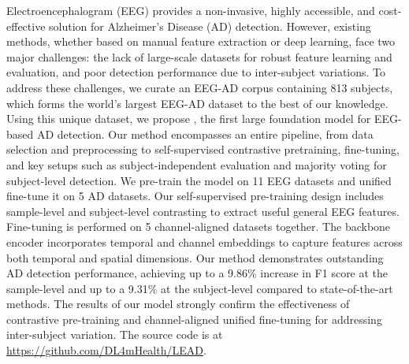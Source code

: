 

Electroencephalogram (EEG) provides a non-invasive, highly accessible, and cost-effective solution for Alzheimer’s Disease (AD) detection. However, existing methods, whether based on manual feature extraction or deep learning, face two major challenges: the lack of large-scale datasets for robust feature learning and evaluation, and poor detection performance due to inter-subject variations. To address these challenges, we curate an EEG-AD corpus containing 813 subjects, which forms the world’s largest EEG-AD dataset to the best of our knowledge. Using this unique dataset, we propose \name, the first large foundation model for EEG-based AD detection. Our method encompasses an entire pipeline, from data selection and preprocessing to self-supervised contrastive pretraining, fine-tuning, and key setups such as subject-independent evaluation and majority voting for subject-level detection. We pre-train the model on 11 EEG datasets and unified fine-tune it on 5 AD datasets. Our self-supervised pre-training design includes sample-level and subject-level contrasting to extract useful general EEG features. Fine-tuning is performed on 5 channel-aligned datasets together. The backbone encoder incorporates temporal and channel embeddings to capture features across both temporal and spatial dimensions. Our method demonstrates outstanding AD detection performance, achieving up to a 9.86\% increase in F1 score at the sample-level and up to a 9.31\%  at the subject-level compared to state-of-the-art methods. The results of our model strongly confirm the effectiveness of contrastive pre-training and channel-aligned unified fine-tuning for addressing inter-subject variation. The source code is at \url{https://github.com/DL4mHealth/LEAD}.